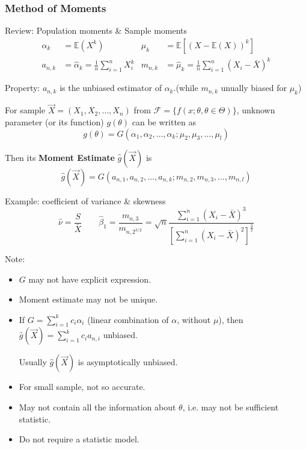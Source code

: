 \subsubsection{Method of Moments}\label{SubSectionMoM}
    Review: Population moments \& Sample moments
    \begin{align*}
        \alpha_k&=\mathbb{E}(X^k)&\mu_k&=\mathbb{E}[(X-\mathbb{E}(X))^k]\\
        a_{n,k}&=\hat{\alpha }_k =\frac{1}{n}\sum_{i=1}^nX_i^k&m_{n,k}&=\hat{\mu }_k=\frac{1}{n}\sum_{i=1}^n(X_i-\bar{X})^k
    \end{align*}

    Property: $a_{n,k}$ is the unbiased estimator of $\alpha_k$.(while $m_{n,k}$ unually biased for $\mu_k$)

    For sample $\vec{X}=(X_1,X_2,\ldots,X_n)$ from $\mathscr{F}=\{f(x;\theta,\theta\in\Theta)\}$, unknown parameter (or its function) $g(\theta)$ can be written as
    \begin{equation}
        g(\theta)=G(\alpha_1,\alpha_2,\ldots,\alpha_k;\mu_2,\mu_3,\ldots,\mu_l)    
    \end{equation}

    Then its \textbf{Moment Estimate} $\hat{g}(\vec{X})$ is
\begin{equation}
    \hat{g}(\vec{X})=G(a_{n,1},a_{n,2},\ldots,a_{n,k};m_{n,2},m_{n,3},\ldots,m_{n,l}) 
\end{equation}

    Example: coefficient of variance \& skewness 
    \begin{equation}\hat{\nu}=\dfrac{S}{\bar{X}}\qquad\hat{\beta}_1=\dfrac{m_{n,3}}{m_{n,2^{3/2}}}=\sqrt{n}{\displaystyle\frac{\displaystyle{\sum_{i=1}^n(X_i-\bar{X})^3}}{\displaystyle{\left[\sum_{i=1}^n(X_i-\bar{X})^2\right]^{\frac{3}{2}}}  }}\end{equation}

    \begin{point}
        Note:
    \end{point}
    
        
    \begin{itemize}
        \item $G$ may not have explicit expression.
        \item Moment estimate may not be unique.
        \item If $G={\displaystyle\sum_{i=1}^kc_i\alpha_i}$ (linear combination of $\alpha$, without $\mu$), then $\hat{g}(\vec{X})={\displaystyle\sum_{i=1}^kc_ia_{n,i}}$ unbiased.
        
        \qquad Usually $\hat{g}(\vec{X})$ is asymptotically unbiased.
        \item For small sample, not so accurate.
        \item May not contain all the information about $\theta$, i.e. may not be sufficient statistic.
        \item Do not require a statistic model.
    \end{itemize}


